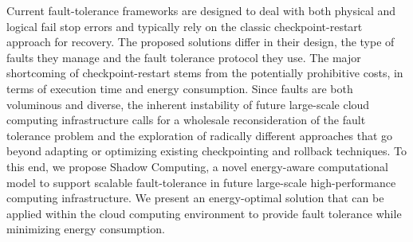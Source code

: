 Current fault-tolerance frameworks are designed to deal with both
physical and logical fail stop errors and typically rely on the
classic checkpoint-restart approach for recovery. The proposed
solutions differ in their design, the type of faults they manage and
the fault tolerance protocol they use.  The major shortcoming of
checkpoint-restart stems from the potentially prohibitive costs, in
terms of execution time and energy consumption. Since faults are both
voluminous and diverse, the inherent instability of future large-scale
cloud computing infrastructure calls for a wholesale reconsideration
of the fault tolerance problem and the exploration of radically
different approaches that go beyond adapting or optimizing existing
checkpointing and rollback techniques. To this end, we propose Shadow
Computing, a novel energy-aware computational model to support
scalable fault-tolerance in future large-scale high-performance
computing infrastructure. We present an energy-optimal solution that
can be applied within the cloud computing environment to provide fault
tolerance while minimizing energy consumption.
